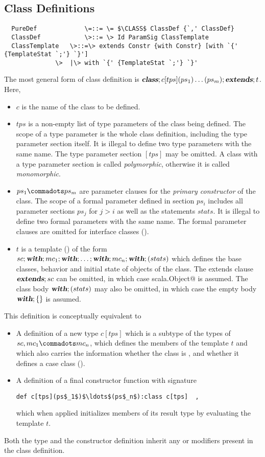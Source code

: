 \documentclass[11pt]{report}
\begin{document}
\begin{itemize}
\section{Class Definitions}
\label{sec:classes}

\syntax\begin{verbatim}
  PureDef             \=::= \= $\CLASS$ ClassDef {`,' ClassDef}
  ClassDef            \>::= \> Id ParamSig ClassTemplate
  ClassTemplate   \>::=\> extends Constr {with Constr} [with `{' {TemplateStat `;'} `}']
	          \>  |\> with `{' {TemplateStat `;'} `}'
\end{verbatim}

The most general form of class definition is $\mbox{\sl\bfseries class};c[tps](ps_1)
\ldots (ps_m);\mbox{\sl\bfseries extends};t$. Here,
\begin{itemize}
\item[]
$c$ is the name of the class to be defined.
\item[]
$tps$ is a non-empty list of type parameters of the class being
defined.  The scope of a type parameter is the whole class definition,
including the type parameter section itself.  It is illegal to define
two type parameters with the same name.  The type parameter section
$[tps]$ may be omitted. A class with a type parameter section is
called {\em polymorphic}, otherwise it is called {\em monomorphic}.
\item[] $ps_1 \commadots ps_m$ are parameter clauses for the {\em primary
constructor} of the class. The scope of a formal parameter defined in
section $ps_i$ includes all parameter sections $ps_j$ for $j > i$ as
well as the statements $stats$.  It is illegal to define two formal
parameters with the same name.  The formal
parameter clauses are omitted for interface classes ().
\item[] $t$ is a
template () of the form
$sc;\mbox{\sl\bfseries with};mc_1;\mbox{\sl\bfseries with};\ldots;\mbox{\sl\bfseries with};mc_n;\mbox{\sl\bfseries with};(stats)$
which defines the base classes, behavior and initial state of objects of
the class. The extends clause $\mbox{\sl\bfseries extends};sc$ can be omitted, in which case
\verb@extends scala.Object@ is assumed.  The class body
$\mbox{\sl\bfseries with};(stats)$ may also be omitted, in which case the empty body
$\mbox{\sl\bfseries with};\{\}$ is assumed.
\end{itemize}
This definition is conceptually equivalent to
\begin{itemize}
\item[]
A definition of a new type $c[tps]$ which is a subtype of the types of
$sc, mc_1 \commadots mc_n$, which defines the
members of the template $t$ and which also carries the information
whether the class is \verb@final@, and whether it defines a case class
().
\item[]
A definition of a final constructor function with signature
\begin{verbatim}
def c[tps](ps$_1$)$\ldots$(ps$_n$):class c[tps]  ,
\end{verbatim}
which when applied
initializes members of its result type by evaluating the template $t$.
\end{itemize}
Both the type and the constructor definition inherit any
\verb@private@ or \verb@protected@ modifiers present in the class
definition.


\end{itemize}
\end{document}
